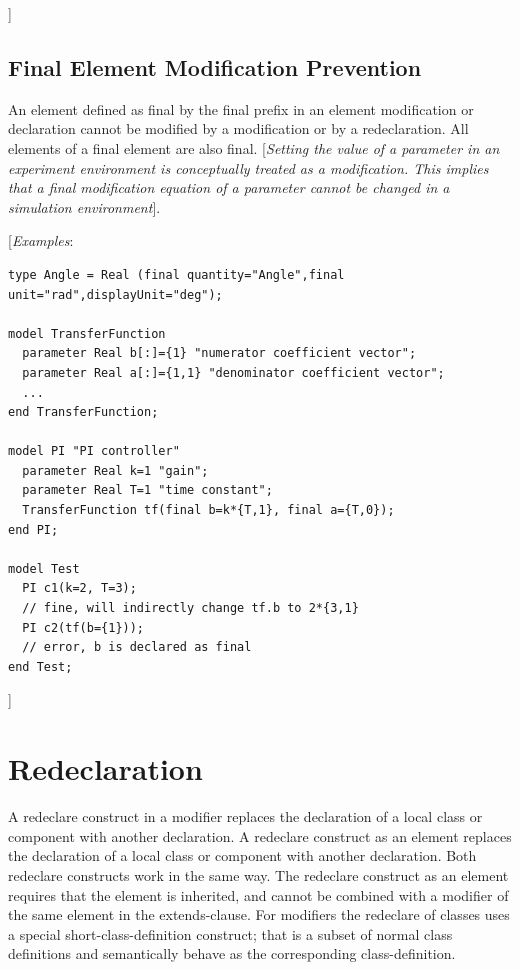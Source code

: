 \documentclass[10pt,a4paper]{report}
\def\doublelabel#1{\label{#1}}
\begin{document}
{]}

\subsection{Final Element Modification Prevention}\doublelabel{final-element-modification-prevention}

An element defined as final by the final prefix in an element
modification or declaration cannot be modified by a modification or by a
redeclaration. All elements of a final element are also final.
{[}\emph{Setting the value of a parameter in an experiment environment
is conceptually treated as a modification. This implies that a final
modification equation of a parameter cannot be changed in a simulation
environment}{]}.

{[}\emph{Examples}:
\begin{lstlisting}[language=modelica]
type Angle = Real (final quantity="Angle",final unit="rad",displayUnit="deg");

model TransferFunction
  parameter Real b[:]={1} "numerator coefficient vector";
  parameter Real a[:]={1,1} "denominator coefficient vector";
  ...
end TransferFunction;

model PI "PI controller"
  parameter Real k=1 "gain";
  parameter Real T=1 "time constant";
  TransferFunction tf(final b=k*{T,1}, final a={T,0});
end PI;

model Test
  PI c1(k=2, T=3);
  // fine, will indirectly change tf.b to 2*{3,1}
  PI c2(tf(b={1}));
  // error, b is declared as final
end Test;
\end{lstlisting}
{]}

\section{Redeclaration}\doublelabel{redeclaration}

A redeclare construct in a modifier replaces the declaration of a local
class or component with another declaration. A redeclare construct as an
element replaces the declaration of a local class or component with
another declaration. Both redeclare constructs work in the same way. The
redeclare construct as an element requires that the element is
inherited, and cannot be combined with a modifier of the same element in
the extends-clause. For modifiers the redeclare of classes uses a
special short-class-definition construct; that is a subset of normal
class definitions and semantically behave as the corresponding
class-definition.
\end{document}
